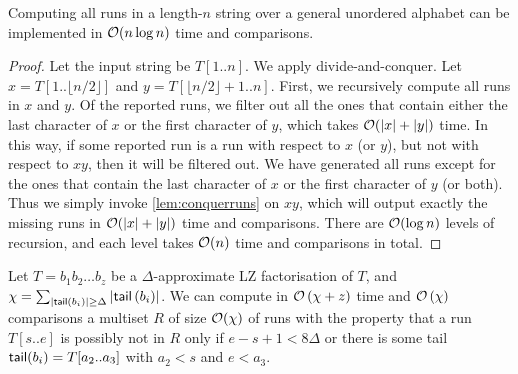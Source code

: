 \begin{lemma}
\label{lem:divideruns}
Computing all runs in a length-$n$ string over a general unordered alphabet can be implemented in $\mathcal{O}(n\log n)$ time and comparisons.
\end{lemma}

\begin{proof}
Let the input string be $T[1..n]$. We apply divide-and-conquer. Let $x=T[1..\lfloor n/2\rfloor]$ and $y=T[\lfloor n/2\rfloor + 1..n]$.
First, we recursively compute all runs in $x$ and $y$. Of the reported runs, we filter out all the ones that contain either the last character of $x$ or the first character of $y$, which takes $\mathcal{O}(\left\lvert x\right\rvert + \left\lvert y\right\rvert)$ time.
In this way, if some reported run is a run with respect to $x$ (or $y$), but not with respect to $xy$, then it will be filtered out.
We have generated all runs except for the ones that contain the last character of $x$ or the first character of $y$ (or both). Thus we simply invoke
\cref{lem:conquerruns} on $xy$, which will output exactly the missing runs in $\mathcal{O}(\left\lvert x\right\rvert + \left\lvert y\right\rvert)$ time and comparisons.
There are $\mathcal{O}(\log n)$ levels of recursion, and each level takes $\mathcal{O}(n)$ time and comparisons in total.
\end{proof}

\begin{lemma}
\label{lem:long:run}
Let $T = b_{1}b_{2}\ldots b_{z}$ be a $\Delta$-approximate LZ factorisation of $T$, and \sloppy $\chi = \sum_{\left\lvert\textsf{tail}\left(b_{i}\right)\right\rvert \geq \Delta}\left\lvert\textsf{tail}\left(b_{i}\right)\right\rvert$.
We can compute in $\mathcal{O}\left(\chi + z\right)$ time and $\mathcal{O}\left(\chi\right)$ comparisons
a multiset $R$ of size $\mathcal{O}(\chi)$ of runs with the property that a run $T[s..e]$ is possibly not in $R$ only if $e-s+1 < 8\Delta$ or
there is some tail $\textsf{tail}(b_i) = T[a_2..a_3]$ with $a_2 < s$ and $e < a_3$.
\end{lemma}

